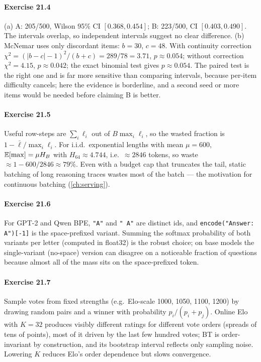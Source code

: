 \paragraph{Exercise 21.4} (a) A: 205/500, Wilson 95\% CI $[0.368, 0.454]$; B: 223/500, CI
$[0.403, 0.490]$. The intervals overlap, so independent intervals suggest no clear difference.
(b) McNemar uses only discordant items: $b = 30$, $c = 48$. With continuity correction
$\chi^2 = (|b-c|-1)^2/(b+c) = 289/78 = 3.71$, $p \approx 0.054$; without correction $\chi^2 = 4.15$,
$p \approx 0.042$; the exact binomial test gives $p \approx 0.054$. The paired test is the right one
and is far more sensitive than comparing intervals, because per-item difficulty cancels; here the
evidence is borderline, and a second seed or more items would be needed before claiming B is better.

\paragraph{Exercise 21.5} Useful row-steps are $\sum_i \ell_i$ out of $B \max_i \ell_i$, so the
wasted fraction is $1 - \bar\ell / \max_i \ell_i$. For i.i.d.\ exponential lengths with mean
$\mu = 600$, $\mathbb{E}[\max] = \mu H_B$ with $H_{64} \approx 4.744$, i.e.\ $\approx 2846$ tokens, so
waste $\approx 1 - 600/2846 \approx 79\%$. Even with a budget cap that truncates the tail, static
batching of long reasoning traces wastes most of the batch --- the motivation for continuous
batching (\cref{ch:serving}).

\paragraph{Exercise 21.6} For GPT-2 and Qwen BPE, \texttt{"A"} and \texttt{" A"} are distinct ids,
and \texttt{encode("Answer: A")[-1]} is the space-prefixed variant. Summing the softmax probability of
both variants per letter (computed in float32) is the robust choice; on base models the
single-variant (no-space) version can disagree on a noticeable fraction of questions because almost
all of the mass sits on the space-prefixed token.

\paragraph{Exercise 21.7} Sample votes from fixed strengths (e.g.\ Elo-scale 1000, 1050, 1100, 1200)
by drawing random pairs and a winner with probability $p_i/(p_i+p_j)$. Online Elo with $K = 32$
produces visibly different ratings for different vote orders (spreads of tens of points), most of it
driven by the last few hundred votes; BT is order-invariant by construction, and its bootstrap
interval reflects only sampling noise. Lowering $K$ reduces Elo's order dependence but slows
convergence.

